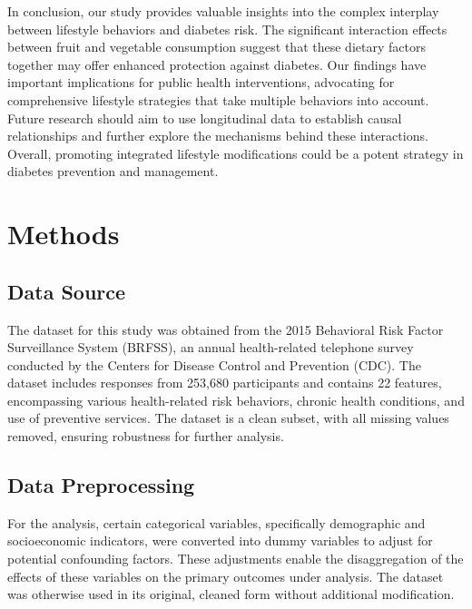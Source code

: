 \documentclass[11pt]{article}
\begin{document}
In conclusion, our study provides valuable insights into the complex interplay between lifestyle behaviors and diabetes risk. The significant interaction effects between fruit and vegetable consumption suggest that these dietary factors together may offer enhanced protection against diabetes. Our findings have important implications for public health interventions, advocating for comprehensive lifestyle strategies that take multiple behaviors into account. Future research should aim to use longitudinal data to establish causal relationships and further explore the mechanisms behind these interactions. Overall, promoting integrated lifestyle modifications could be a potent strategy in diabetes prevention and management.

\section*{Methods}

\subsection*{Data Source}
The dataset for this study was obtained from the 2015 Behavioral Risk Factor Surveillance System (BRFSS), an annual health-related telephone survey conducted by the Centers for Disease Control and Prevention (CDC). The dataset includes responses from 253,680 participants and contains 22 features, encompassing various health-related risk behaviors, chronic health conditions, and use of preventive services. The dataset is a clean subset, with all missing values removed, ensuring robustness for further analysis.

\subsection*{Data Preprocessing}
For the analysis, certain categorical variables, specifically demographic and socioeconomic indicators, were converted into dummy variables to adjust for potential confounding factors. These adjustments enable the disaggregation of the effects of these variables on the primary outcomes under analysis. The dataset was otherwise used in its original, cleaned form without additional modification.
\end{document}

